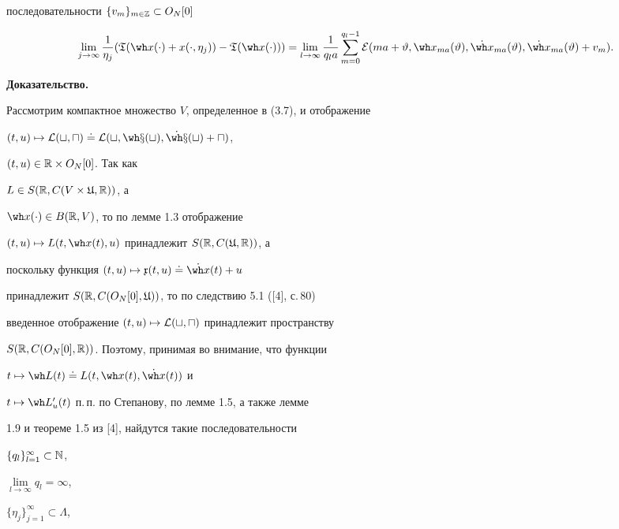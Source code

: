 \begin{lems}
последовательности $\{v_m\}_{m\in\Bbb Z}\subset O_N[0]$


\begin{equation}


\lim_{j\to\infty}\frac{1}{\eta_j}(\frak T(\wh x(\cdot)+


x(\cdot,\eta_j))-\frak T(\wh x(\cdot)))=


\lim_{l\to\infty}\frac{1}{q_l a}


\sum_{m=0}^{q_l-1}{\cal E}(ma+\vartheta,\wh x_{ma}(\vartheta),


\Dot{\wh x}_{ma}(\vartheta),\Dot{\wh x}_{ma}(\vartheta)+v_m).


\end{equation}


\end{lems}





{\bf Доказательство.}


Рассмотрим компактное множество $V$, определенное в (3.7), и отображение


$(t,u)\mapsto\cal L(t,u)\doteq L(t,\wh x(t),\dot{\wh x}(t)+u)$,


$(t,u)\in\Bbb R\times O_N[0]$. Так как


$L\in S({\Bbb R},C(V\times\frak U,\Bbb R))$, а


$\wh x(\cdot)\in B(\Bbb R,V)$, то по лемме 1.3 отображение


$(t,u)\mapsto L(t,\wh x(t),u)$ принадлежит $S(\Bbb R,C(\frak U,\Bbb R))$, а


поскольку функция $(t,u)\mapsto\frak x(t,u)\doteq\Dot{\wh x}(t)+u$


принадлежит $S(\Bbb R,C(O_N[0],\frak U))$, то по следствию 5.1 ([4], с.\,80)


введенное отображение $(t,u)\mapsto\cal L(t,u)$ принадлежит пространству


$S(\Bbb R,C(O_N[0],\Bbb R))$. Поэтому, принимая во внимание, что функции


$t\mapsto\wh L(t)\doteq L(t,\wh x(t),\Dot{\wh x}(t))$ и


$t\mapsto\wh L'_u(t)$ п.\,п. по Степанову, по лемме 1.5, а также лемме


1.9 и теореме 1.5 из [4], найдутся такие последовательности


$\{q_l\}_{l=1}^\infty\subset\Bbb N$,


$\lim\limits_{l\to\infty}q_l=\infty$,


$\{\eta_j\}_{j=1}^\infty\subset\Lambda$,


